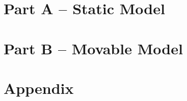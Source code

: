 \documentclass[a4paper]{article}
\begin{document}
\pagestyle{empty}

\newpage
\tableofcontents
\clearpage
\pagestyle{plain}
\section{Part A -- Static Model}


\newpage
\section{Part B -- Movable Model}


\newpage
\section{Appendix}

\end{document}
